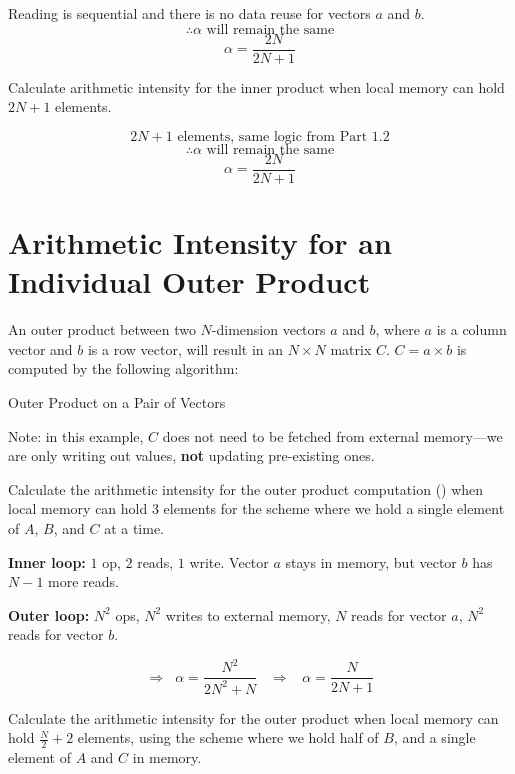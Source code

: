 \documentclass[a4 paper]{article}
\begin{document}
Reading is sequential and there is no data reuse for vectors $a$ and $b$. 
\[
\therefore \alpha \text{ will remain the same}
\]
\[
\alpha = \frac{2N}{2N+1}
\]

Calculate arithmetic intensity for the inner product when local memory can hold $2N + 1$ elements.


\[
2N+1 \text{ elements, same logic from Part 1.2}
\]
\[
\therefore \alpha \text{ will remain the same}
\]
\[
\alpha = \frac{2N}{2N+1}
\]

\newpage
\section{Arithmetic Intensity for an Individual Outer Product}
\label{sec:op_ai}
An outer product between two $N$-dimension vectors $a$ and $b$, where $a$ is a column vector and $b$ is a row vector, will result in an $N \times N$ matrix $C$.
$C = a \times b$ is computed by the following algorithm:

\begin{algorithm}
\SetAlgoLined
\SetInd{0.25em}{0.5em}
\caption{Outer Product on a Pair of Vectors}
\label{algo:outer-product}
\end{algorithm}
\noindent
Note: in this example, $C$ does not need to be fetched from external memory---we are only writing out values, \textbf{not} updating pre-existing ones.

Calculate the arithmetic intensity for the outer product computation () when local memory can hold 3 elements for the scheme where we hold a single element of $A$, $B$, and $C$ at a time.



\textbf{Inner loop:} $1$ op, $2$ reads, $1$ write. 
Vector $a$ stays in memory, but vector $b$ has $N-1$ more reads. 

\medskip
\textbf{Outer loop:} $N^2$ ops, $N^2$ writes to external memory, 
$N$ reads for vector $a$, $N^2$ reads for vector $b$.

\[
\Rightarrow \;\; \alpha = \frac{N^2}{2N^2 + N}
\;\;\;\Rightarrow\;\;\;
\alpha = \frac{N}{2N+1}
\]

Calculate the arithmetic intensity for the outer product when local memory can hold $\frac{N}{2} + 2$ elements, using the scheme where we hold half of $B$, and a single element of $A$ and $C$ in memory.
\end{document}
